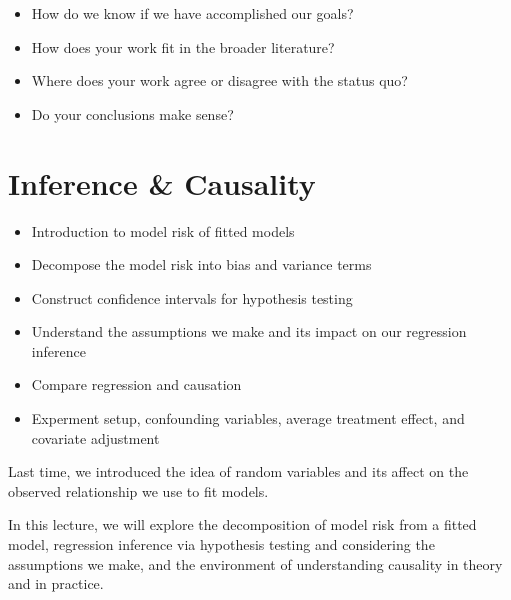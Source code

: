 \documentclass[
  letterpaper,
  DIV=11,
  numbers=noendperiod]{scrreprt}
\providecommand{\tightlist}{%
  \setlength{\itemsep}{0pt}\setlength{\parskip}{0pt}}\usepackage{longtable,booktabs,array}
\begin{document}
\begin{enumerate}
  \begin{itemize}
  \tightlist
  \item
    How do we know if we have accomplished our goals?
  \item
    How does your work fit in the broader literature?
  \item
    Where does your work agree or disagree with the status quo?
  \item
    Do your conclusions make sense?
  \end{itemize}
\end{enumerate}


\hypertarget{inference-causality}{%
\chapter{Inference \& Causality}\label{inference-causality}}

\begin{tcolorbox}[enhanced jigsaw, breakable, colbacktitle=quarto-callout-note-color!10!white, colback=white, opacitybacktitle=0.6, opacityback=0, bottomrule=.15mm, titlerule=0mm, toptitle=1mm, bottomtitle=1mm, left=2mm, colframe=quarto-callout-note-color-frame, title=\textcolor{quarto-callout-note-color}{\faInfo}\hspace{0.5em}{Note}, rightrule=.15mm, toprule=.15mm, leftrule=.75mm, arc=.35mm, coltitle=black]

\begin{itemize}
\tightlist
\item
  Introduction to model risk of fitted models
\item
  Decompose the model risk into bias and variance terms
\item
  Construct confidence intervals for hypothesis testing
\item
  Understand the assumptions we make and its impact on our regression
  inference
\item
  Compare regression and causation
\item
  Experment setup, confounding variables, average treatment effect, and
  covariate adjustment
\end{itemize}

\end{tcolorbox}

Last time, we introduced the idea of random variables and its affect on
the observed relationship we use to fit models.

In this lecture, we will explore the decomposition of model risk from a
fitted model, regression inference via hypothesis testing and
considering the assumptions we make, and the environment of
understanding causality in theory and in practice.
\end{document}
